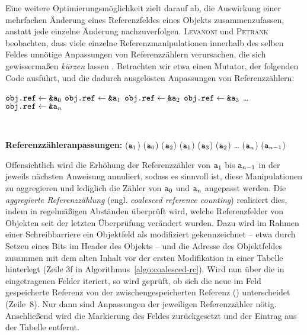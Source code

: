 Eine weitere Optimierungsmöglichkeit zielt darauf ab, die Auswirkung einer mehrfachen Änderung eines Referenzfeldes eines Objekts zusammenzufassen, anstatt jede einzelne Änderung nachzuverfolgen.
\textsc{Levanoni} und \textsc{Petrank} beobachten, dass viele einzelne Referenzmanipulationen innerhalb des selben Feldes unnötige Anpassungen von Referenzzählern verursachen, die sich gewissermaßen \textit{kürzen} lassen \cite[S. 4ff]{levanoni2006}.
Betrachten wir etwa einen Mutator, der folgenden Code ausführt, und die dadurch ausgelösten Anpassungen von Referenzzählern:

\begin{center}
\begin{minipage}{0.3\textwidth}
	\centering
	\begin{algorithmic}[1]
		\Statex $\texttt{obj.ref} \gets \texttt{\&a}_0$
		\Statex $\texttt{obj.ref} \gets \texttt{\&a}_1$
		\Statex $\texttt{obj.ref} \gets \texttt{\&a}_2$
		\Statex $\texttt{obj.ref} \gets \texttt{\&a}_3$
		\Statex \dots
		\Statex $\texttt{obj.ref} \gets \texttt{\&a}_n$
	\end{algorithmic}
\end{minipage}~
\begin{minipage}{0.6\textwidth}
	\centering
	\begin{algorithmic}[1]
		\Statex \textbf{Referenzzähleranpassungen:}
		\Statex {}($\texttt{a}_1$) \quad {}($\texttt{a}_0$)
		\Statex {}($\texttt{a}_2$) \quad {}($\texttt{a}_1$)
		\Statex {}($\texttt{a}_3$) \quad {}($\texttt{a}_2$)
		\Statex \dots
		\Statex {}($\texttt{a}_n$) \quad {}($\texttt{a}_{n-1}$)
	\end{algorithmic}
\end{minipage}
\end{center}

Offensichtlich wird die Erhöhung der Referenzzähler von $\texttt{a}_1$ bis $\texttt{a}_{n-1}$ in der jeweils nächsten Anweisung annuliert, sodass es sinnvoll ist, diese Manipulationen zu aggregieren und lediglich die Zähler von $\texttt{a}_0$ und $\texttt{a}_n$ angepasst werden.
Die \textit{aggregierte Referenzzählung} (engl. \textit{coalesced reference counting}) realisiert dies, indem in regelmäßigen Abständen überprüft wird, welche Referenzfelder von Objekten seit der letzten Überprüfung verändert wurden.
Dazu wird im Rahmen einer Schreibbarriere ein Objektfeld als modifiziert gekennzeichnet -- etwa durch Setzen eines Bits im Header des Objekts -- und die Adresse des Objektfeldes zusammen mit dem alten Inhalt vor der ersten Modifikation in einer Tabelle  hinterlegt (Zeile 3f in Algorithmus~\ref{algo:coalesced-rc}).
Wird nun über die in  eingetragenen Felder iteriert, so wird geprüft, ob sich die neue im Feld gespeicherte Referenz  von der zwischengespeicherten Referenz () unterscheidet (Zeile~8).
Nur dann sind Anpassungen der jeweiligen Referenzzähler nötig.
Anschließend wird die Markierung des Feldes zurückgesetzt und der Eintrag aus der Tabelle entfernt.

